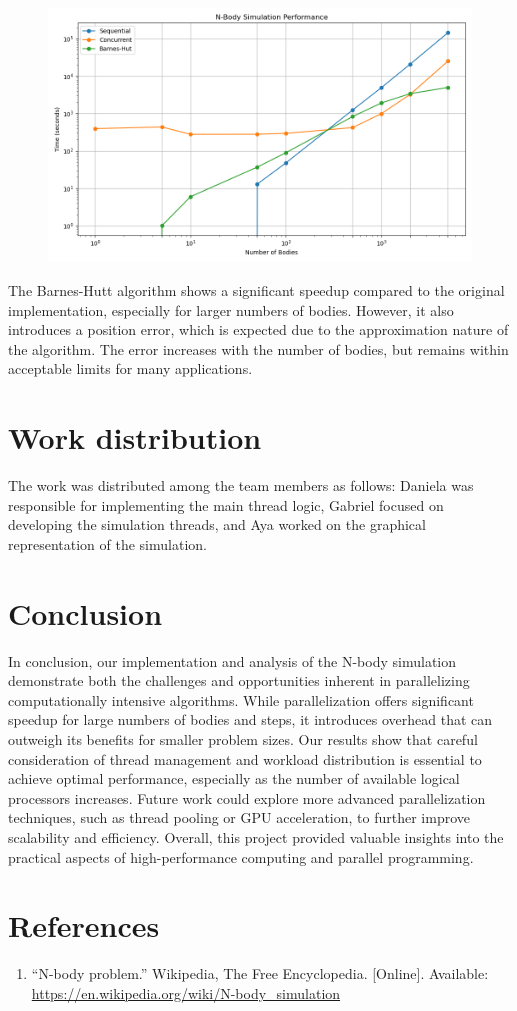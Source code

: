 \documentclass{article}
\begin{document}
\begin{figure}
        \centering
        \includegraphics[width=1\linewidth]{n_body_simulation_performance.png}
        \label{fig:enter-label}
\end{figure}

The Barnes-Hutt algorithm shows a significant speedup compared to the original implementation, especially for larger numbers of bodies. However, it also introduces a position error, which is expected due to the approximation nature of the algorithm. The error increases with the number of bodies, but remains within acceptable limits for many applications.


\section{Work distribution}
The work was distributed among the team members as follows: Daniela was responsible for implementing the main thread logic, Gabriel focused on developing the simulation threads, and Aya worked on the graphical representation of the simulation.

\section{Conclusion}
In conclusion, our implementation and analysis of the N-body simulation demonstrate both the challenges and opportunities inherent in parallelizing computationally intensive algorithms. While parallelization offers significant speedup for large numbers of bodies and steps, it introduces overhead that can outweigh its benefits for smaller problem sizes. Our results show that careful consideration of thread management and workload distribution is essential to achieve optimal performance, especially as the number of available logical processors increases. Future work could explore more advanced parallelization techniques, such as thread pooling or GPU acceleration, to further improve scalability and efficiency. Overall, this project provided valuable insights into the practical aspects of high-performance computing and parallel programming.

\section{References}
\begin{enumerate}
    \item ``N-body problem.'' Wikipedia, The Free Encyclopedia. [Online]. Available: \url{https://en.wikipedia.org/wiki/N-body_simulation}
\end{enumerate}
\end{document}
